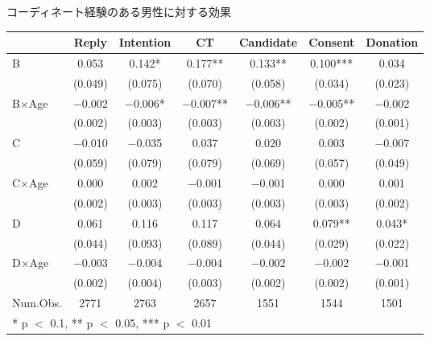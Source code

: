 \documentclass[
      aspectratio=169,
        12pt,
    ]{beamer}
\begin{document}
\begin{frame}{コーディネート経験のある男性に対する効果}
\protect\hypertarget{ux30b3ux30fcux30c7ux30a3ux30cdux30fcux30c8ux7d4cux9a13ux306eux3042ux308bux7537ux6027ux306bux5bfeux3059ux308bux52b9ux679c}{}
\begin{table}
\centering
\fontsize{9}{11}\selectfont
\begin{tabular}[t]{lcccccc}
\toprule
  & Reply & Intention & CT & Candidate & Consent & Donation\\
\midrule
B & \num{0.053} & \num{0.142}* & \num{0.177}** & \num{0.133}** & \num{0.100}*** & \num{0.034}\\
 & (\num{0.049}) & (\num{0.075}) & (\num{0.070}) & (\num{0.058}) & (\num{0.034}) & (\num{0.023})\\
B×Age & \num{-0.002} & \num{-0.006}* & \num{-0.007}** & \num{-0.006}** & \num{-0.005}** & \num{-0.002}\\
 & (\num{0.002}) & (\num{0.003}) & (\num{0.003}) & (\num{0.003}) & (\num{0.002}) & (\num{0.001})\\
C & \num{-0.010} & \num{-0.035} & \num{0.037} & \num{0.020} & \num{0.003} & \num{-0.007}\\
 & (\num{0.059}) & (\num{0.079}) & (\num{0.079}) & (\num{0.069}) & (\num{0.057}) & (\num{0.049})\\
C×Age & \num{0.000} & \num{0.002} & \num{-0.001} & \num{-0.001} & \num{0.000} & \num{0.001}\\
 & (\num{0.002}) & (\num{0.003}) & (\num{0.003}) & (\num{0.003}) & (\num{0.003}) & (\num{0.002})\\
D & \num{0.061} & \num{0.116} & \num{0.117} & \num{0.064} & \num{0.079}** & \num{0.043}*\\
 & (\num{0.044}) & (\num{0.093}) & (\num{0.089}) & (\num{0.044}) & (\num{0.029}) & (\num{0.022})\\
D×Age & \num{-0.003} & \num{-0.004} & \num{-0.004} & \num{-0.002} & \num{-0.002} & \num{-0.001}\\
 & (\num{0.002}) & (\num{0.004}) & (\num{0.003}) & (\num{0.002}) & (\num{0.002}) & (\num{0.001})\\
\midrule
Num.Obs. & \num{2771} & \num{2763} & \num{2657} & \num{1551} & \num{1544} & \num{1501}\\
\bottomrule
\multicolumn{7}{l}{\rule{0pt}{1em}* p $<$ 0.1, ** p $<$ 0.05, *** p $<$ 0.01}\\
\end{tabular}
\end{table}
\end{frame}
\end{document}
